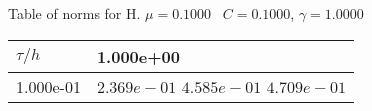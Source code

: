 \begin{center}
Table of norms for H. $\mu = 0.1000$ \, $C = 0.1000$, $\gamma = 1.0000$
  
\begin{tabular}{|p{1in}|p{1in}|} \hline
$\tau / h$ &1.000e+00 \\ \hline 
1.000e-01 & $2.369e-01$  $4.585e-01$  $4.709e-01$  \\ \hline 

\end{tabular}\\[20pt]
\end{center}
